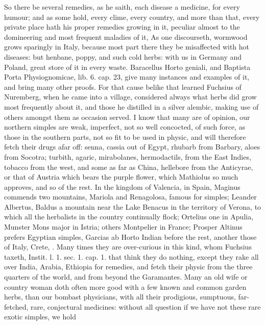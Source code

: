 {So there be several remedies, as he saith, each disease a
medicine, for every humour; and as some hold, every clime, every
country, and more than that, every private place hath his proper
remedies growing in it, peculiar almost to the domineering and most
frequent maladies of it, As one discourseth, wormwood grows
sparingly in Italy, because most part there they be misaffected with
hot diseases: but henbane, poppy, and such cold herbs: with us in
Germany and Poland, great store of it in every waste. Baracellus Horto
geniali, and Baptista Porta Physiognomicae, lib. 6. cap. 23, give many
instances and examples of it, and bring many other proofs. For that
cause belike that learned Fuchsius of Nuremberg, when he came
into a village, considered always what herbs did grow most frequently
about it, and those he distilled in a silver alembic, making use of
others amongst them as occasion served. I know that many are of
opinion, our northern simples are weak, imperfect, not so well
concocted, of such force, as those in the southern parts, not so fit to
be used in physic, and will therefore fetch their drugs afar off:
senna, cassia out of Egypt, rhubarb from Barbary, aloes from Socotra;
turbith, agaric, mirabolanes, hermodactils, from the East Indies,
tobacco from the west, and some as far as China, hellebore from the
Anticyrae, or that of Austria which bears the purple flower, which
Mathiolus so much approves, and so of the rest. In the kingdom of
Valencia, in Spain, Maginus commends two mountains, Mariola and
Renagolosa, famous for simples;  Leander Albertus, Baldus a
mountain near the Lake Benacus in the territory of Verona, to which all
the herbalists in the country continually flock; Ortelius one in
Apulia, Munster Mons major in Istria; others Montpelier in France;
Prosper Altinus prefers Egyptian simples, Garcias ab Horto Indian
before the rest, another those of Italy, Crete, \etc{}. Many times they are
over-curious in this kind, whom Fuchsius taxeth, Instit. l. 1. sec. 1.
cap. 1. that think they do nothing, except they rake all over
India, Arabia, Ethiopia for remedies, and fetch their physic from the
three quarters of the world, and from beyond the Garamantes. Many an
old wife or country woman doth often more good with a few known and
common garden herbs, than our bombast physicians, with all their
prodigious, sumptuous, far-fetched, rare, conjectural medicines:
without all question if we have not these rare exotic simples, we hold
}
